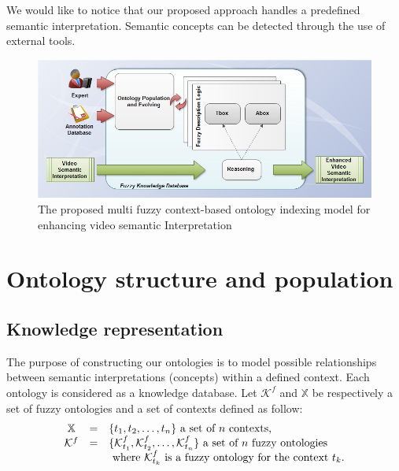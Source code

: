 		We would like to notice that our proposed approach handles a
		predefined semantic interpretation.
		Semantic concepts can be detected through the use of external tools.

		\begin{figure}[ht!]	
			\centering
			\includegraphics[width=\textwidth]{graphics/ontoSystem_2}
			\caption{The proposed multi fuzzy context-based ontology indexing 
						model for enhancing video semantic Interpretation}
			\label{fig:proposed_system}
		\end{figure}	

		\section{Ontology structure and population}

		\subsection{Knowledge representation}
		The purpose of constructing our ontologies is to model possible 
		relationships between semantic interpretations (concepts) within a defined context.
		Each ontology is considered as a knowledge database.
		Let $\mathcal{K}^{f}$ and $\mathbb{X}$ be respectively a set of fuzzy
		ontologies and a set of contexts defined as follow: 
		\begin{equation*}
			\begin{array}{ c c l }
			\mathbb{X} & = & \{t_{1}, t_{2}, \ldots, t_{n} \} \text{ a set of $n$ contexts,}\\
			\mathcal{K}^{f} & = &  \{\mathcal{K}^{f}_{t_{1}},\mathcal{K}^{f}_{t_{2}}, 
				\ldots, \mathcal{K}^{f}_{t_{n}}\} \text{ a set of $n$ fuzzy ontologies }  \\
				& &  \text{ where } \mathcal{K}^{f}_{t_{k}} \text{ is a fuzzy ontology for the context } t_{k}.
			\end{array}
		\end{equation*}
		
